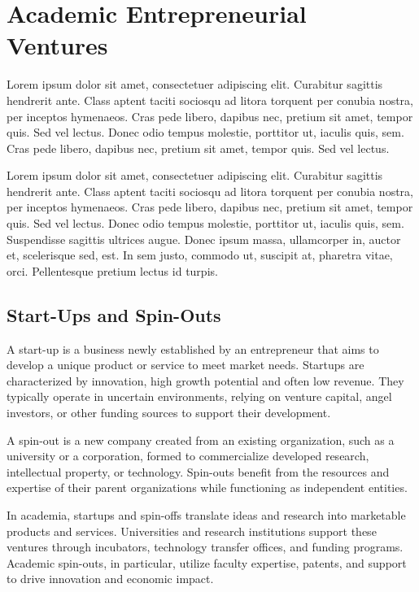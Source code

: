 \chapter{Academic Entrepreneurial Ventures}

\begin{chapterabstract}
	Lorem ipsum dolor sit amet, consectetuer adipiscing elit. Curabitur sagittis hendrerit ante. Class aptent taciti sociosqu ad litora torquent per conubia nostra, per inceptos hymenaeos. Cras pede libero, dapibus nec, pretium sit amet, tempor quis. Sed vel lectus. Donec odio tempus molestie, porttitor ut, iaculis quis, sem. Cras pede libero, dapibus nec, pretium sit amet, tempor quis. Sed vel lectus. 
\end{chapterabstract}

Lorem ipsum dolor sit amet, consectetuer adipiscing elit. Curabitur sagittis hendrerit ante. Class aptent taciti sociosqu ad litora torquent per conubia nostra, per inceptos hymenaeos. Cras pede libero, dapibus nec, pretium sit amet, tempor quis. Sed vel lectus. Donec odio tempus molestie, porttitor ut, iaculis quis, sem. Suspendisse sagittis ultrices augue. Donec ipsum massa, ullamcorper in, auctor et, scelerisque sed, est. In sem justo, commodo ut, suscipit at, pharetra vitae, orci. Pellentesque pretium lectus id turpis.

\section{Start-Ups and Spin-Outs}
A start-up is a business newly established by an entrepreneur that aims to develop a unique product or service to meet market needs. Startups are characterized by innovation, high growth potential and often low revenue. They typically operate in uncertain environments, relying on venture capital, angel investors, or other funding sources to support their development.

A spin-out is a new company created from an existing organization, such as a university or a corporation, formed to commercialize developed research, intellectual property, or technology. Spin-outs benefit from the resources and expertise of their parent organizations while functioning as independent entities.

In academia, startups and spin-offs translate ideas and research into marketable products and services. Universities and research institutions support these ventures through incubators, technology transfer offices, and funding programs. Academic spin-outs, in particular, utilize faculty expertise, patents, and support to drive innovation and economic impact.

